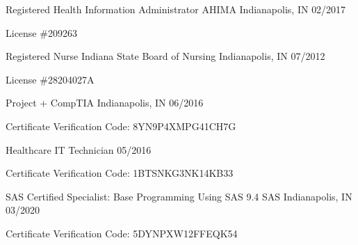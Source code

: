 

\begin{cventries}

  \cventry
    {Registered Health Information Administrator} %
    {AHIMA} %
    {Indianapolis, IN} %
    {02/2017} %
    {
      \begin{cvitems} %
        \item {License \#209263}
      \end{cvitems}
    }

  \cventry
    {Registered Nurse} %
    {Indiana State Board of Nursing} %
    {Indianapolis, IN} %
    {07/2012} %
    {
      \begin{cvitems} %
        \item {License \#28204027A}
      \end{cvitems}
    }

  \cventry
    {Project +} %
    {CompTIA} %
    {Indianapolis, IN} %
    {06/2016} %
    {
      \begin{cvitems} %
        \item {Certificate Verification Code: 8YN9P4XMPG41CH7G}
      \end{cvitems}
    }
  \cventry
    {Healthcare IT Technician} %
    {} %
    {} %
    {05/2016} %
    {
      \begin{cvitems} %
        \item {Certificate Verification Code: 1BTSNKG3NK14KB33}
      \end{cvitems}
    }

  \cventry
    {SAS Certified Specialist: Base Programming Using SAS 9.4} %
    {SAS} %
    {Indianapolis, IN} %
    {03/2020} %
    {
      \begin{cvitems} %
        \item {Certificate Verification Code: 5DYNPXW12FFEQK54}
      \end{cvitems}
    }



\end{cventries}
